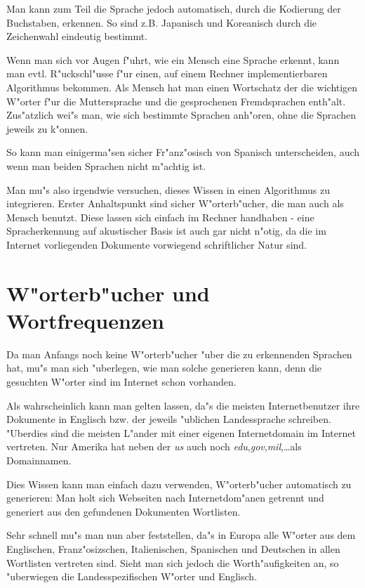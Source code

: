 Man kann zum Teil die Sprache jedoch automatisch, durch die Kodierung der Buchstaben, erkennen. So sind z.B. Japanisch und Koreanisch durch die Zeichenwahl eindeutig bestimmt.

Wenn man sich vor Augen f"uhrt, wie ein Mensch eine Sprache erkennt, kann man evtl. R"uckschl"usse f"ur einen, auf einem Rechner implementierbaren Algorithmus bekommen. Als Mensch hat man einen Wortschatz der die wichtigen W"orter f"ur die Muttersprache und die gesprochenen Fremdsprachen enth"alt. Zus"atzlich wei"s man, wie sich bestimmte Sprachen anh"oren, ohne die Sprachen jeweils zu k"onnen.

So kann man einigerma"sen sicher Fr"anz"osisch von Spanisch unterscheiden, auch wenn man beiden Sprachen nicht m"achtig ist.

Man mu"s also irgendwie versuchen, dieses Wissen in einen Algorithmus zu integrieren. Erster Anhaltspunkt sind sicher W"orterb"ucher, die man auch als Mensch benutzt. Diese lassen sich einfach im Rechner handhaben - eine Spracherkennung auf akustischer Basis ist auch gar nicht n"otig, da die im Internet vorliegenden Dokumente vorwiegend schriftlicher Natur sind.



\section{W"orterb"ucher und Wortfrequenzen}
\label{WoerterbuecherUndWortfrequenzen}

Da man Anfangs noch keine W"orterb"ucher "uber die zu erkennenden Sprachen hat, mu"s man sich "uberlegen, wie man solche generieren kann, denn die gesuchten W"orter sind im Internet schon vorhanden.

Als wahrscheinlich kann man gelten lassen, da"s die meisten Internetbenutzer ihre Dokumente in Englisch bzw. der jeweils "ublichen Landessprache schreiben. "Uberdies sind die meisten L"ander mit einer eigenen Internetdomain im Internet vertreten. Nur Amerika hat neben der {\em us} auch noch {\em edu},{\em gov},{\em mil},\dots als Domainnamen.

Dies Wissen kann man einfach dazu verwenden, W"orterb"ucher automatisch zu generieren: Man holt sich Webseiten nach Internetdom"anen getrennt und generiert aus den gefundenen Dokumenten Wortlisten.

Sehr schnell mu"s man nun aber feststellen, da"s in Europa alle W"orter aus dem Englischen, Franz"osizschen, Italienischen, Spanischen und Deutschen in allen Wortlisten vertreten sind. Sieht man sich jedoch die Worth"aufigkeiten an, so "uberwiegen die Landesspezifischen W"orter und Englisch.

